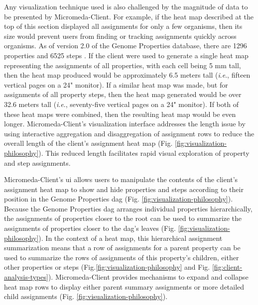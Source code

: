 Any visualization technique used is also challenged by the magnitude of data to 
be presented by Micromeda-Client. For example, if the heat map described at the 
top of this section displayed all assignments for only a few organisms, then its 
size would prevent users from finding or tracking assignments quickly across 
organisms. As of version 2.0 of the Genome Properties database, there are 1296 
properties and 6525 steps \cite{richardson2018genome}. If the client were used 
to generate a single heat map representing the assignments of all properties, 
with each cell being 5 mm tall, then the heat map produced would be 
approximately 6.5 meters tall (\textit{i}.\textit{e}., fifteen vertical pages on 
a 24" monitor). If a similar heat map was made, but for assignments of all 
property steps, then the heat map generated would be over 32.6 meters tall 
(\textit{i}.\textit{e}., seventy-five vertical pages on a 24" monitor). If both 
of these heat maps were combined, then the resulting heat map would be even 
longer. Micromeda-Client's visualization interface addresses the length issue by 
using interactive aggregation and disaggregation \cite{munzner2015visualization} 
of assignment rows to reduce the overall length of the client's assignment heat 
map (Fig. \ref{fig:visualization-philosophy}). This reduced length facilitates 
rapid visual exploration of property and step assignments.

Micromeda-Client's \gls{ui} allows users to manipulate the contents of the 
client's assignment heat map to show and hide properties and steps according to 
their position in the Genome Properties \gls{dag} \cite{richardson2018genome} 
(Fig. \ref{fig:visualization-philosophy}). Because the Genome Properties 
\gls{dag} arranges individual properties hierarchically, the assignments of 
properties closer to the root can be used to summarize the assignments of 
properties closer to the \gls{dag}'s leaves (Fig. 
\ref{fig:visualization-philosophy}). In the context of a heat map, this 
hierarchical assignment summarization means that a row of assignments for a 
parent property can be used to summarize the rows of assignments of this 
property's children, either other properties or steps 
(Fig.\ref{fig:visualization-philosophy} and Fig. 
\ref{fig:client-analysis-types}). Micromeda-Client provides mechanisms to expand 
and collapse heat map rows to display either parent summary assignments or more 
detailed child assignments (Fig. \ref{fig:visualization-philosophy}).

